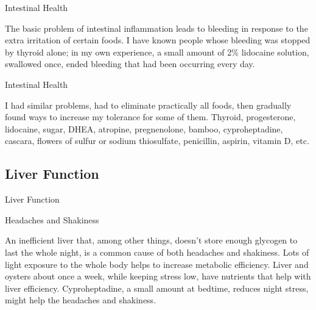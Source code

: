 \documentclass[11pt,oneside,openany,extrafontsizes]{memoir}
\begin{document}
\begin{standalonequote}{Intestinal Health}

    \begin{answer}
      The basic problem of intestinal inflammation leads to bleeding in response to the extra irritation of certain foods. I have known people whose bleeding was stopped by thyroid alone; in my own experience, a small amount of 2\% lidocaine solution, swallowed once, ended bleeding that had been occurring every day.
    \end{answer}
\end{standalonequote}

\begin{standalonequote}{Intestinal Health}

    \begin{answer}
      I had similar problems, had to eliminate practically all foods, then gradually found ways to increase my tolerance for some of them. Thyroid, progesterone, lidocaine, sugar, DHEA, atropine, pregnenolone, bamboo, cyproheptadine, cascara, flowers of sulfur or sodium thiosulfate, penicillin, aspirin, vitamin D, etc.
    \end{answer}
\end{standalonequote}

\subsection{Liver Function}

\begin{standalonequote}{Liver Function}
    \begin{note}
        Headaches and Shakiness
    \end{note}

    \begin{answer}
        An inefficient liver that, among other things, doesn't store enough glycogen to last the whole night, is a common cause of both headaches and shakiness. Lots of light exposure to the whole body helps to increase metabolic efficiency. Liver and oysters about once a week, while keeping stress low, have nutrients that help with liver efficiency. Cyproheptadine, a small amount at bedtime, reduces night stress, might help the headaches and shakiness.
    \end{answer}
\end{standalonequote}
\end{document}
